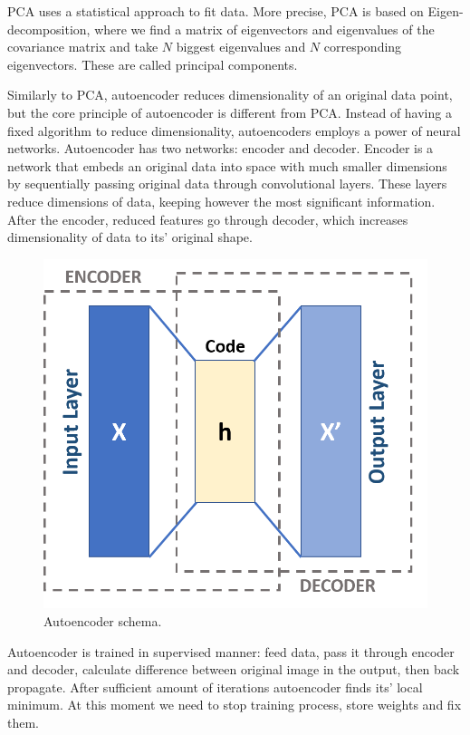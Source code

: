 PCA uses a statistical approach to fit data. More precise, PCA is based on Eigen-decomposition, where we find a matrix of eigenvectors and eigenvalues of the covariance matrix and take $N$ biggest eigenvalues and $N$ corresponding eigenvectors. These are called principal components.

Similarly to PCA, autoencoder reduces dimensionality of an original data point, but the core principle of autoencoder is different from PCA. Instead of having a fixed algorithm to reduce dimensionality, autoencoders employs a power of neural networks. Autoencoder has two networks: encoder and decoder. Encoder is a network that embeds an original data into space with much smaller dimensions by sequentially passing original data through convolutional layers. These layers reduce dimensions of data, keeping however the most significant information. After the encoder, reduced features go through decoder, which increases dimensionality of data to its' original shape.

\begin{figure}[!ht]
    \centering
    \includegraphics[width=\textwidth]{figure/Autoencoder_schema.png}
    \caption{Autoencoder schema.}
    \label{autoencoder-schema}
\end{figure}

Autoencoder is trained in supervised manner: feed data, pass it through encoder and decoder, calculate difference between original image in the output, then back propagate. After sufficient amount of iterations autoencoder finds its' local minimum. At this moment we need to stop training process, store weights and fix them.

